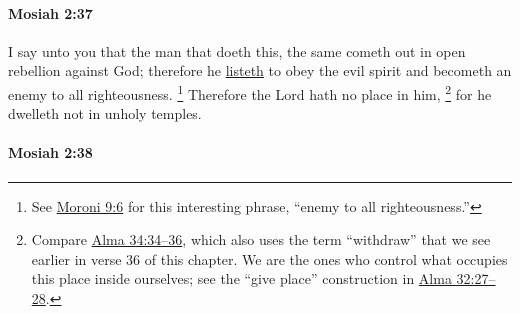 		\paragraph{Mosiah 2:37} %
			\label{MOSIAH-2-37}

			I say unto you that the man that doeth this,
			the same cometh out in open rebellion against God;
			therefore he \hyperref[LIST-1828]{listeth} to obey the evil spirit
			and becometh an enemy to all righteousness.%
				\footnote{%
					\label{MOSIAH-2-37-NOTE-enemy}%
					See \hyperref[MORONI-9-6-NOTE-enemy]{Moroni 9:6} for this interesting phrase, ``enemy to all righteousness.''
					}
			Therefore the Lord hath no place in him,%
				\footnote{%
					\label{MOISAH-2-37-NOTE-place}%
					Compare \hyperref[ALMA-34-34]{Alma 34:34--36}, which also uses the term ``withdraw'' that we see earlier in verse 36 of this chapter. We are the ones who control what occupies this place inside ourselves; see the ``give place'' construction in \hyperref[ALMA-32-27]{Alma 32:27--28}.
					}
			for he dwelleth not in unholy temples.

		\paragraph{Mosiah 2:38} %
			\label{MOSIAH-2-38}

